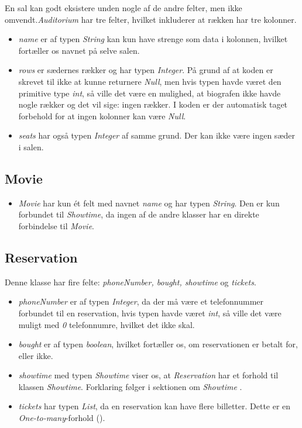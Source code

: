 En sal kan godt eksistere unden nogle af de andre felter, men ikke omvendt.\textit{Auditorium} har tre felter, hvilket inkluderer at rækken har tre kolonner.
\begin{itemize}

  \item \textit{name} er af typen \textit{String} kan kun have strenge som data i kolonnen, hvilket fortæller os navnet på selve salen.
  \item \textit{rows} er sædernes rækker og har typen \textit{Integer}. På grund af at koden er skrevet til ikke at kunne returnere \textit{Null}, men hvis typen havde været den primitive type \textit{int}, så ville det være en mulighed, at biografen ikke havde nogle rækker og det vil sige: ingen rækker. I koden er der automatisk taget forbehold for at ingen kolonner kan være \textit{Null}.
  \item \textit{seats} har også typen \textit{Integer} af samme grund. Der kan ikke være ingen sæder i salen.

\end{itemize}

\subsection{Movie}

\begin{itemize}

  \item \textit{Movie} har kun ét felt med navnet \textit{name} og har typen \textit{String}. Den er kun forbundet til \textit{Showtime}, da ingen af de andre klasser har en direkte forbindelse til \textit{Movie}.

\end{itemize}

\subsection{Reservation}

Denne klasse har fire felte: \textit{phoneNumber, bought, showtime} og \textit{tickets}.

\begin{itemize}
  \item \textit{phoneNumber} er af typen \textit{Integer}, da der må være et telefonnummer forbundet til en reservation, hvis typen havde været \textit{int}, så ville det være muligt med \textit{0} telefonnumre, hvilket det ikke skal.
  \item \textit{bought} er af typen \textit{boolean}, hvilket fortæller os, om reservationen er betalt for, eller ikke. 
  \item \textit{showtime} med typen \textit{Showtime} viser os, at \textit{Reservation} har et forhold til klassen \textit{Showtime}. Forklaring følger i sektionen om \textit{Showtime} .
  \item \textit{tickets} har typen \textit{List}, da en reservation kan have flere billetter. Dette er en \textit{One-to-many}-forhold (\cite{https://learnit.itu.dk/pluginfile.php/114939/mod_resource/content/0/GRPRO-14.pdf}).

\end{itemize}

